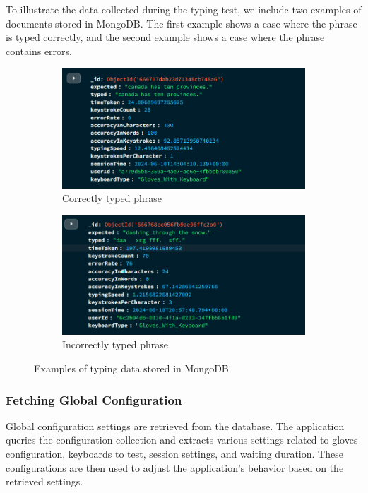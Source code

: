 To illustrate the data collected during the typing test, we include two examples of documents stored in MongoDB. The first example shows a case where the phrase is typed correctly, and the second example shows a case where the phrase contains errors.

\begin{figure}[h]
    \centering
    \begin{subfigure}[b]{0.45\textwidth}
        \centering
        \includegraphics[width=\textwidth]{Scenario/Correct_Phrase.PNG}
        \caption{Correctly typed phrase}
        \label{fig:correct_case}
    \end{subfigure}
    \hfill
    \begin{subfigure}[b]{0.45\textwidth}
        \centering
        \includegraphics[width=\textwidth]{Scenario/wrong_Phrase.PNG}
        \caption{Incorrectly typed phrase}
        \label{fig:incorrect_case}
    \end{subfigure}
    \caption{Examples of typing data stored in MongoDB}
    \label{fig:database_examples}
\end{figure}

\subsubsection{Fetching Global Configuration}
Global configuration settings are retrieved from the database. The application queries the configuration collection and extracts various settings related to gloves configuration, keyboards to test, session settings, and waiting duration. These configurations are then used to adjust the application’s behavior based on the retrieved settings.

